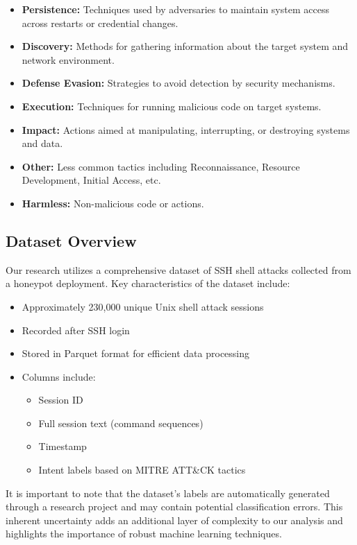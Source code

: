     \begin{itemize}
        \item \textbf{Persistence:} Techniques used by adversaries to maintain system access across restarts or credential changes.
        \item \textbf{Discovery:} Methods for gathering information about the target system and network environment.
        \item \textbf{Defense Evasion:} Strategies to avoid detection by security mechanisms.
        \item \textbf{Execution:} Techniques for running malicious code on target systems.
        \item \textbf{Impact:} Actions aimed at manipulating, interrupting, or destroying systems and data.
        \item \textbf{Other:} Less common tactics including Reconnaissance, Resource Development, Initial Access, etc.
        \item \textbf{Harmless:} Non-malicious code or actions.
    \end{itemize}

    \subsection{Dataset Overview}
    
    Our research utilizes a comprehensive dataset of SSH shell attacks collected from a honeypot deployment. Key characteristics of the dataset include:

    \begin{itemize}
        \item Approximately 230,000 unique Unix shell attack sessions
        \item Recorded after SSH login
        \item Stored in Parquet format for efficient data processing
        \item Columns include:
        \begin{itemize}
            \item Session ID
            \item Full session text (command sequences)
            \item Timestamp
            \item Intent labels based on MITRE ATT\&CK tactics
        \end{itemize}
    \end{itemize}

    It is important to note that the dataset's labels are automatically generated through a research project and may contain potential classification errors. This inherent uncertainty adds an additional layer of complexity to our analysis and highlights the importance of robust machine learning techniques.

